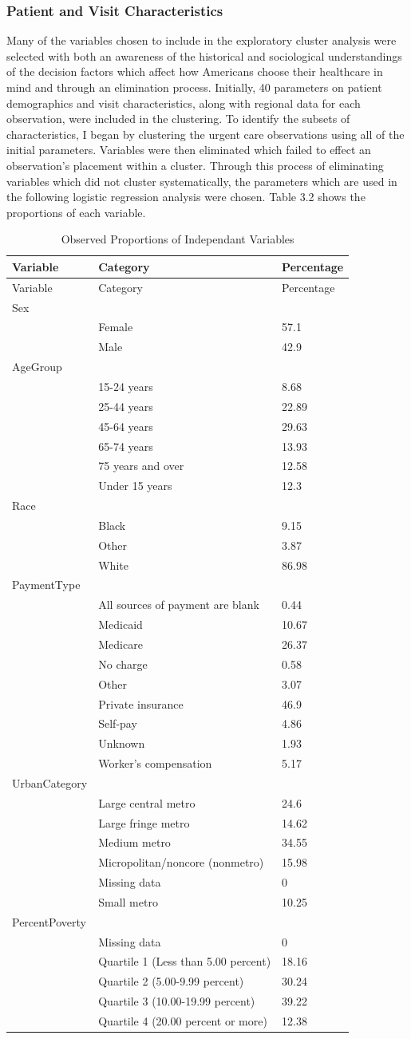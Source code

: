 \documentclass[12pt,twoside]{reedthesis}
\begin{document}
  \subsubsection*{Patient and Visit
  Characteristics}\label{patient-and-visit-characteristics}
  
  Many of the variables chosen to include in the exploratory cluster
  analysis were selected with both an awareness of the historical and
  sociological understandings of the decision factors which affect how
  Americans choose their healthcare in mind and through an elimination
  process. Initially, 40 parameters on patient demographics and visit
  characteristics, along with regional data for each observation, were
  included in the clustering. To identify the subsets of characteristics,
  I began by clustering the urgent care observations using all of the
  initial parameters. Variables were then eliminated which failed to
  effect an observation's placement within a cluster. Through this process
  of eliminating variables which did not cluster systematically, the
  parameters which are used in the following logistic regression analysis
  were chosen. Table 3.2 shows the proportions of each variable.
  
  \singlespacing
  
  \begin{longtable}[c]{@{}lll@{}}
  \caption{Observed Proportions of Independant Variables
  \label{tab:sums}}\tabularnewline
  \toprule
  Variable & Category & Percentage\tabularnewline
  \midrule
  \endfirsthead
  \toprule
  Variable & Category & Percentage\tabularnewline
  \midrule
  \endhead
  Sex & &\tabularnewline
  & Female & 57.1\tabularnewline
  & Male & 42.9\tabularnewline
  AgeGroup & &\tabularnewline
  & 15-24 years & 8.68\tabularnewline
  & 25-44 years & 22.89\tabularnewline
  & 45-64 years & 29.63\tabularnewline
  & 65-74 years & 13.93\tabularnewline
  & 75 years and over & 12.58\tabularnewline
  & Under 15 years & 12.3\tabularnewline
  Race & &\tabularnewline
  & Black & 9.15\tabularnewline
  & Other & 3.87\tabularnewline
  & White & 86.98\tabularnewline
  PaymentType & &\tabularnewline
  & All sources of payment are blank & 0.44\tabularnewline
  & Medicaid & 10.67\tabularnewline
  & Medicare & 26.37\tabularnewline
  & No charge & 0.58\tabularnewline
  & Other & 3.07\tabularnewline
  & Private insurance & 46.9\tabularnewline
  & Self-pay & 4.86\tabularnewline
  & Unknown & 1.93\tabularnewline
  & Worker's compensation & 5.17\tabularnewline
  UrbanCategory & &\tabularnewline
  & Large central metro & 24.6\tabularnewline
  & Large fringe metro & 14.62\tabularnewline
  & Medium metro & 34.55\tabularnewline
  & Micropolitan/noncore (nonmetro) & 15.98\tabularnewline
  & Missing data & 0\tabularnewline
  & Small metro & 10.25\tabularnewline
  PercentPoverty & &\tabularnewline
  & Missing data & 0\tabularnewline
  & Quartile 1 (Less than 5.00 percent) & 18.16\tabularnewline
  & Quartile 2 (5.00-9.99 percent) & 30.24\tabularnewline
  & Quartile 3 (10.00-19.99 percent) & 39.22\tabularnewline
  & Quartile 4 (20.00 percent or more) & 12.38\tabularnewline
  \bottomrule
  \end{longtable}
  
\end{document}
